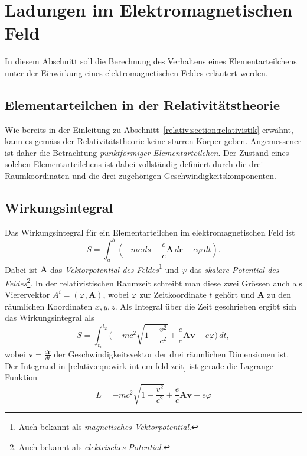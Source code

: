 
\section{Ladungen im Elektromagnetischen Feld
\label{relativ:section:em_feld}}

In diesem Abschnitt soll die Berechnung des Verhaltens eines Elementarteilchens
unter der Einwirkung eines elektromagnetischen Feldes erläutert werden.


\subsection{Elementarteilchen in der Relativitätstheorie
\label{relativ:section:elementarteilchen}}

Wie bereits in der Einleitung zu Abschnitt~\ref{relativ:section:relativistik} erwähnt,
kann es gemäss der Relativitätstheorie keine starren Körper geben.
Angemessener ist daher die Betrachtung \emph{punktförmiger Elementarteilchen}.
Der Zustand eines solchen Elementarteilchens ist dabei vollständig definiert durch
die drei Raumkoordinaten und die drei zugehörigen Geschwindigkeitskomponenten.


\subsection{Wirkungsintegral
\label{relativ:section:wirkungsintegral}}

Das Wirkungsintegral für ein Elementarteilchen im elektromagnetischen Feld ist
\begin{equation}
    S = \int_a^b \left(-mc\,ds + \frac{e}{c} \mathbf{A}\,d\mathbf{r} - e\varphi\,dt\right).
    \label{relativ:eqn:wirk-int-em-feld}
\end{equation}
Dabei ist \(\mathbf{A}\) das \emph{Vektorpotential des Feldes}\footnote{
    Auch bekannt als \emph{magnetisches Vektorpotential}.}
und \(\varphi\) das \emph{skalare Potential des Feldes}\footnote{
    Auch bekannt als \emph{elektrisches Potential}.}.
In der relativistischen Raumzeit schreibt man diese zwei Grössen
auch als Vierervektor \(A^i = (\varphi, \mathbf{A})\),
wobei \(\varphi\) zur Zeitkoordinate \(t\) gehört und
\(\mathbf{A}\) zu den räumlichen Koordinaten \(x, y, z\).
Als Integral über die Zeit geschrieben ergibt sich das Wirkungsintegral als
\begin{equation}
    S = \int_{t_1}^{t_2} \biggl( -mc^2 \sqrt{1-\frac{v^2}{c^2}} + \frac{e}{c} \mathbf{A} \mathbf{v} - e \varphi \biggr) \, dt,
    \label{relativ:eqn:wirk-int-em-feld-zeit}
\end{equation}
wobei \(\displaystyle \mathbf{v} = \frac{d\mathbf{r}}{dt}\) der Geschwindigkeitsvektor der drei räumlichen Dimensionen ist.
Der Integrand in \eqref{relativ:eqn:wirk-int-em-feld-zeit} ist gerade die Lagrange-Funktion
\begin{equation}
    L = -mc^2 \sqrt{1-\frac{v^2}{c^2}} + \frac{e}{c} \mathbf{A} \mathbf{v} - e \varphi
    \label{relativ:eqn:lagrange-em-feld}
\end{equation}


